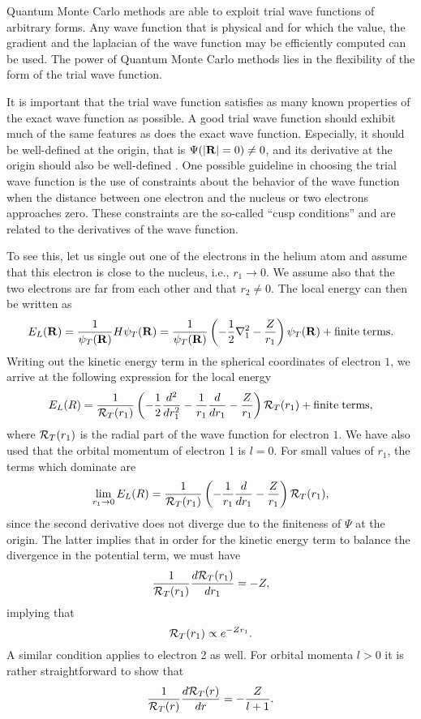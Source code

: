 Quantum Monte Carlo methods are able to exploit trial 
wave functions of arbitrary forms. Any wave function 
that is physical and for which the value,
the gradient and the laplacian of the wave function 
may be efficiently computed can be used. 
The power of Quantum Monte Carlo methods lies in the 
flexibility of the form of the trial wave function. 

It is important that the trial wave function satisfies 
as many known properties of the exact wave function as possible. 
A good trial wave function should exhibit much of the same features
as does the exact wave function. Especially, it should be well-defined
at the origin, that is $\Psi (|{\bf R}|=0)\ne 0$, and its derivative at the origin 
should also be well-defined .
One possible guideline in choosing the trial wave function
is the  use of 
constraints about the behavior of the wave function
when the distance between one electron and the nucleus or two electrons
approaches zero. 
These constraints are the so-called ``cusp conditions''
and are related to the derivatives of
the wave function. 

To see this, let us single out one of the electrons in the 
helium atom and assume that this electron is close to
the nucleus, i.e., $r_1 \rightarrow 0$. We assume also
that the two electrons are far from each other and that 
$r_2 \ne 0$. 
The local energy can then be written as
\[
   E_L({\bf R})=\frac{1}{\psi_T({\bf R})}H\psi_T({\bf R})=
     \frac{1}{\psi_T({\bf R})}\left(-\frac{1}{2}\nabla^2_1
     -\frac{Z}{r_1}\right)\psi_T({\bf R}) + \mathrm{finite \hspace{0.1cm}terms}.
\]
Writing out the kinetic energy term in the spherical coordinates
of electron $1$, we arrive at the following expression for the 
local energy
\[ 
    E_L(R)=
    \frac{1}{{\cal R}_T(r_1)}\left(-\frac{1}{2}\frac{d^2}{dr_1^2}-
     \frac{1}{r_1}\frac{d}{dr_1}
     -\frac{Z}{r_1}\right){\cal R}_T(r_1) + \mathrm{finite\hspace{0.1cm} terms},
\]
where ${\cal R}_T(r_1)$ is the radial part of the wave function for electron
$1$. We have also used that the orbital momentum of electron 1 is $l=0$. 
For small values of $r_1$, the terms which dominate are
\[ 
    \lim_{r_1 \rightarrow 0}E_L(R)=
    \frac{1}{{\cal R}_T(r_1)}\left(-
     \frac{1}{r_1}\frac{d}{dr_1}
     -\frac{Z}{r_1}\right){\cal R}_T(r_1),
\]
since the second derivative does not diverge due to the finiteness of 
$\Psi$ at the origin.
The latter implies that in order for the kinetic energy term to balance
the divergence in the potential term, we must have
\[
     \frac{1}{{\cal R}_T(r_1)}\frac{d {\cal R}_T(r_1)}{dr_1}=-Z,
\]
implying that
\[
   {\cal R}_T(r_1)\propto e^{-Zr_1}.
\]
A similar condition applies to electron 2 as well. 
For orbital momenta $l > 0$ it is rather straightforward to show that
\[
     \frac{1}{{\cal R}_T(r)}\frac{d {\cal R}_T(r)}{dr}=-\frac{Z}{l+1}.
\]

